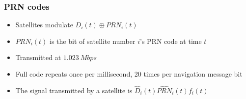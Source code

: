 \documentclass[aspectratio=169]{beamer}
\begin{document}
\begin{frame}
  \frametitle{PRN codes}

  \begin{itemize}
    \item<2-> Satellites modulate $D_i(t) \oplus PRN_i(t)$
    
    \item<3-> $PRN_i(t)$ is the bit of satellite number $i$'s PRN code at time $t$
    
    \item<4-> Transmitted at $\qty{1.023}{Mbps}$
      
    \item<4-> Full code repeats once per millisecond, 20 times per navigation message bit
  \end{itemize}


  \begin{itemize}
    \item<6-> The signal transmitted by a satellite is $\hat{D}_i(t) \hat{PRN}_i(t) f_i(t)$
  \end{itemize}
\end{frame}
\end{document}
